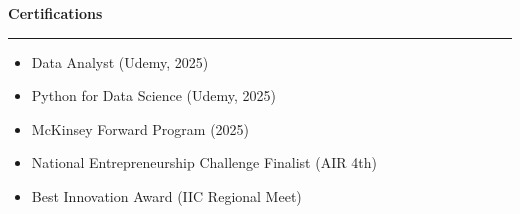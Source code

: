 \documentclass[9pt,letterpaper]{article} %
\newenvironment{rSection}[1]{ %
  \sectionskip
 \textbf{\Large #1} %
  \sectionlineskip
  \hrule %
  \begin{list}{}{ %
    \setlength{\leftmargin}{-0em} %
  }
  \item[]
}{
  \end{list}
}
\def\sectionlineskip{\smallskip} %
\def\sectionskip{} %
\begin{document}
\begin{rSection}{Certifications}
\item[] \vspace{-1em}
\begin{itemize}[left=-1.5em, labelsep=.1cm, labelwidth=.2cm, itemsep=0.0em]

\item Data Analyst (Udemy, 2025)

\item Python for Data Science (Udemy, 2025)

\item McKinsey Forward Program (2025)

\item National Entrepreneurship Challenge Finalist (AIR 4th)

\item Best Innovation Award (IIC Regional Meet)

\end{itemize}
\end{rSection}
\end{document}
